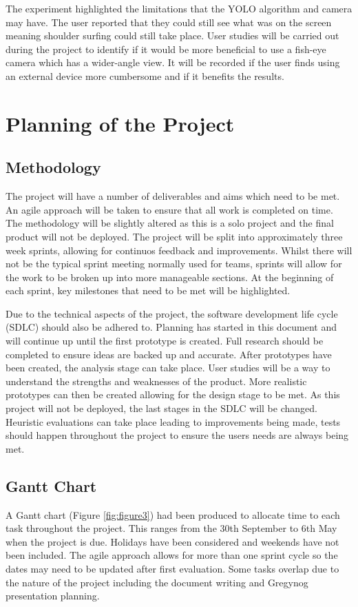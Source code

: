 \documentclass[12pt]{article}
\theoremstyle{plain}
\theoremstyle{definition}
\begin{document}
The experiment highlighted the limitations that the YOLO algorithm and camera may have. The user reported that they could still see what was on the screen meaning shoulder surfing could still take place. 
User studies will be carried out during the project to identify if it would be more beneficial to use a fish-eye camera which has a wider-angle view. It will be recorded if the user finds using an external device more cumbersome and if it benefits the results.


\section{Planning of the Project}
\label{sec:plan}
\subsection{Methodology}
The project will have a number of deliverables and aims which need to be met. An agile approach will be taken to ensure that all work is completed on time. The methodology will be slightly altered as this is a solo project and the final product will not be deployed. The project will be split into approximately three week sprints, allowing for continuos feedback and improvements. Whilst there will not be the typical sprint meeting normally used for teams, sprints will allow for the work to be broken up into more manageable sections. At the beginning of each sprint, key milestones that need to be met will be highlighted.  

Due to the technical aspects of the project, the software development life cycle (SDLC) should also be adhered to. Planning has started in this document and will continue up until the first prototype is created. Full research should be completed to ensure ideas are backed up and accurate. After prototypes have been created, the analysis stage can take place. User studies will be a way to understand the strengths and weaknesses of the product. More realistic prototypes can then be created allowing for the design stage to be met. As this project will not be deployed, the last stages in the SDLC will be changed. Heuristic evaluations can take place leading to improvements being made, tests should happen throughout the project to ensure the users needs are always being met.

\subsection{Gantt Chart}
A Gantt chart (Figure \ref{fig:figure3}) had been produced to allocate time to each task throughout the project. This ranges from the 30th September to 6th May when the project is due. Holidays have been considered and weekends have not been included. The agile approach allows for more than one sprint cycle so the dates may need to be updated after first evaluation. Some tasks overlap due to the nature of the project including the document writing and Gregynog presentation planning.
\end{document}
